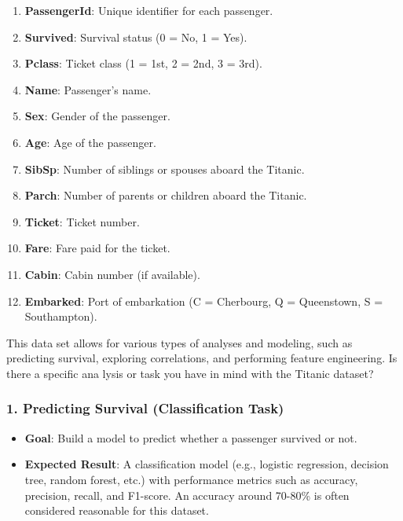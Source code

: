 \documentclass[
]{article}
\providecommand{\tightlist}{%
  \setlength{\itemsep}{0pt}\setlength{\parskip}{0pt}}
\begin{document}
\begin{enumerate}
\def\labelenumi{\arabic{enumi}.}
\tightlist
\item
  \textbf{PassengerId}: Unique identifier for each passenger.
\item
  \textbf{Survived}: Survival status (0 = No, 1 = Yes).
\item
  \textbf{Pclass}: Ticket class (1 = 1st, 2 = 2nd, 3 = 3rd).
\item
  \textbf{Name}: Passenger's name.
\item
  \textbf{Sex}: Gender of the passenger.
\item
  \textbf{Age}: Age of the passenger.
\item
  \textbf{SibSp}: Number of siblings or spouses aboard the Titanic.
\item
  \textbf{Parch}: Number of parents or children aboard the Titanic.
\item
  \textbf{Ticket}: Ticket number.
\item
  \textbf{Fare}: Fare paid for the ticket.
\item
  \textbf{Cabin}: Cabin number (if available).
\item
  \textbf{Embarked}: Port of embarkation (C = Cherbourg, Q = Queenstown,
  S = Southampton).
\end{enumerate}

This data set allows for various types of analyses and modeling, such as
predicting survival, exploring correlations, and performing feature
engineering. Is there a specific ana lysis or task you have in mind with
the Titanic dataset?

\hypertarget{predicting-survival-classification-task}{%
\subsubsection{1. Predicting Survival (Classification
Task)}\label{predicting-survival-classification-task}}

\begin{itemize}
\tightlist
\item
  \textbf{Goal}: Build a model to predict whether a passenger survived
  or not.
\item
  \textbf{Expected Result}: A classification model (e.g., logistic
  regression, decision tree, random forest, etc.) with performance
  metrics such as accuracy, precision, recall, and F1-score. An accuracy
  around 70-80\% is often considered reasonable for this dataset.
\end{itemize}
\end{document}
